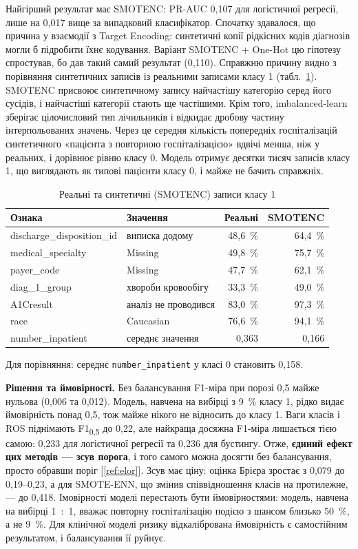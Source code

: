\documentclass[14pt,a4paper]{extreport}
\begin{document}
Найгірший результат має SMOTENC: PR-AUC 0,107 для логістичної регресії, лише на 0,017 вище за випадковий класифікатор. Спочатку здавалося, що причина у взаємодії з Target Encoding: синтетичні копії рідкісних кодів діагнозів могли б підробити їхнє кодування. Варіант SMOTENC + One-Hot цю гіпотезу спростував, бо дав такий самий результат (0,110). Справжню причину видно з порівняння синтетичних записів із реальними записами класу 1 (табл.~\ref{tab:smotenc}). SMOTENC присвоює синтетичному запису найчастішу категорію серед його сусідів, і найчастіші категорії стають ще частішими. Крім того, imbalanced-learn зберігає цілочисловий тип лічильників і відкидає дробову частину інтерпольованих значень. Через це середня кількість попередніх госпіталізацій синтетичного «пацієнта з повторною госпіталізацією» вдвічі менша, ніж у реальних, і дорівнює рівню класу 0. Модель отримує десятки тисяч записів класу 1, що виглядають як типові пацієнти класу 0, і майже не бачить справжніх.

\begin{table}[H]
\caption{Реальні та синтетичні (SMOTENC) записи класу 1}
\label{tab:smotenc}
\begin{tabularx}{\linewidth}{|X|l|r|r|}
\hline
\textbf{Ознака} & \textbf{Значення} & \textbf{Реальні} & \textbf{SMOTENC} \\
\hline
discharge\_disposition\_id & виписка додому & 48,6~\% & 64,4~\% \\
\hline
medical\_specialty & Missing & 49,8~\% & 75,7~\% \\
\hline
payer\_code & Missing & 47,7~\% & 62,1~\% \\
\hline
diag\_1\_group & хвороби кровообігу & 33,3~\% & 49,0~\% \\
\hline
A1Cresult & аналіз не проводився & 83,0~\% & 97,3~\% \\
\hline
race & Caucasian & 76,6~\% & 94,1~\% \\
\hline
number\_inpatient & середнє значення & 0,363 & 0,166 \\
\hline
\end{tabularx}
\end{table}

Для порівняння: середнє \texttt{number\_inpatient} у класі 0 становить 0,158.

\textbf{Рішення та ймовірності.} Без балансування F1-міра при порозі 0,5 майже нульова (0,006 та 0,012). Модель, навчена на вибірці з 9~\% класу 1, рідко видає ймовірність понад 0,5, тож майже нікого не відносить до класу 1. Ваги класів і ROS піднімають F1\textsubscript{0,5} до 0,22, але найкраща досяжна F1-міра лишається тією самою: 0,233 для логістичної регресії та 0,236 для бустингу. Отже, \textbf{єдиний ефект цих методів --- зсув порога}, і того самого можна досягти без балансування, просто обравши поріг [\ref{ref:elor}]. Зсув має ціну: оцінка Брієра зростає з 0,079 до 0,19--0,23, а для SMOTE-ENN, що змінив співвідношення класів на протилежне, --- до 0,418. Імовірності моделі перестають бути ймовірностями: модель, навчена на вибірці 1~:~1, вважає повторну госпіталізацію подією з шансом близько 50~\%, а не 9~\%. Для клінічної моделі ризику відкалібрована ймовірність є самостійним результатом, і балансування її руйнує.
\end{document}
